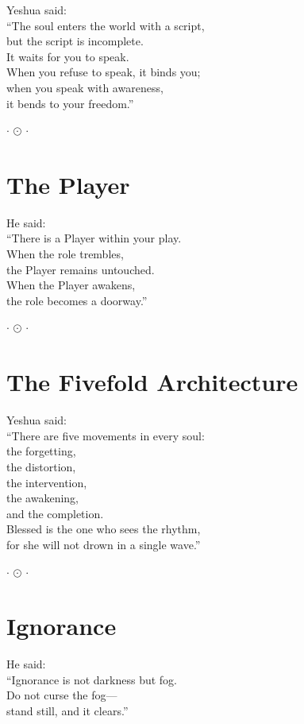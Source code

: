 \documentclass[10pt, openright]{book}
\newcommand{\sectionbreak}{\filbreak}
\newcommand{\ornament}{
    \vspace{1.5cm}
    \begin{center}
        \large \(\cdot\) \(\odot\) \(\cdot\)
    \end{center}
    \vspace{1.5cm}
}
\begin{document}
Yeshua said:\\
``The soul enters the world with a script,\\
but the script is incomplete.\\
It waits for you to speak.\\
When you refuse to speak, it binds you;\\
when you speak with awareness,\\
it bends to your freedom.''

\ornament

\sectionbreak

\section{The Player}\label{the-player}

He said:\\
``There is a Player within your play.\\
When the role trembles,\\
the Player remains untouched.\\
When the Player awakens,\\
the role becomes a doorway.''

\ornament

\sectionbreak

\section{The Fivefold Architecture}\label{the-fivefold-architecture}

Yeshua said:\\
``There are five movements in every soul:\\
the forgetting,\\
the distortion,\\
the intervention,\\
the awakening,\\
and the completion.\\
Blessed is the one who sees the rhythm,\\
for she will not drown in a single wave.''

\ornament

\sectionbreak

\section{Ignorance}\label{ignorance}

He said:\\
``Ignorance is not darkness but fog.\\
Do not curse the fog---\\
stand still, and it clears.''
\end{document}
